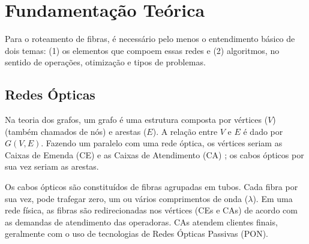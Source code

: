 \section{Fundamentação Teórica} \label{sec:fundaments}

Para o roteamento de fibras, é necessário pelo menos o entendimento básico de 
dois temas: (1) os elementos que compoem essas redes e (2) algoritmos, no sentido
de operações, otimização e tipos de problemas.

\subsection{Redes Ópticas}

Na teoria dos grafos, um grafo é uma estrutura composta por vértices ($V$)
(também chamados de nós) e arestas ($E$). A relação entre $V$ e $E$ é dado por
$G(V,E)$. Fazendo um paralelo com uma rede óptica, os vértices seriam as Caixas
de Emenda (CE) e as Caixas de Atendimento (CA) \cite{maeda2009optical}; os
cabos ópticos por sua vez seriam as arestas.

Os cabos ópticos são constituídos de fibras agrupadas em tubos. Cada fibra por
sua vez, pode trafegar zero, um ou vários comprimentos de onda ($\lambda$).
Em uma rede física, as fibras são redirecionadas nos vértices (CEs e CAs) de
acordo com as demandas de atendimento das operadoras. CAs atendem clientes finais,
geralmente com o uso de tecnologias de Redes Ópticas Passivas (PON).

